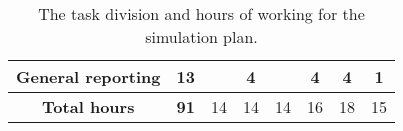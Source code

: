 \begin{center}
\begin{table}[H]
\begin{tabular}{l|c|c|c|c|c|c|c|}
\multicolumn{1}{|l|}{General reporting}    & 13                                     &                 &                 4           &                             & 4                         & 4                            &        1                    \\ \hline
\multicolumn{1}{|c|}{\textbf{Total hours}} &         \textbf{91}                              & 14                        & 14                          & 14                          & 16                         & 18                           & 15                          \\ \hline
\end{tabular}
\caption{The task division and hours of working for the simulation plan.}
\end{table}
\end{center}
\vspace{-10mm}
